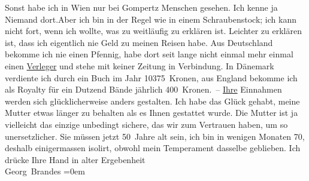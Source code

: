 \begin{ledgroupsized}[t]{13cm}
               Sonst habe ich in Wien nur bei Gompertz Menschen gesehen. Ich kenne {\pb}ja Niemand dort.\hspace*{2em}Aber ich bin in der Regel wie in einem Schraubenstock;
               ich kann nicht fort, wenn ich wollte, was zu weitläufig zu erklären ist. Leichter zu
               erklären ist, dass ich eigentlich nie Geld zu meinen Reisen habe. Aus Deutschland bekomme ich nie einen Pfennig, habe
               dort seit lange nicht einmal mehr einmal einen \uline{Verleger} und stehe mit keiner Zeitung in Verbindung. In Dänemark verdiente ich durch ein Buch im Jahr 10375 Kronen, aus
                  England bekomme ich als Royalty für ein
               Dutzend Bände jährlich 400 Kronen. – \uline{Ihre} Einnahmen
               werden sich glücklicherweise anders gestalten.\pend
           \pstart
           Ich habe das Glück gehabt, meine Mutter etwas länger zu behalten als es Ihnen gestattet wurde. Die Mutter ist
               ja vielleicht das einzige unbedingt sichere, das wir zum Vertrauen haben, um so
               unersetzlicher. Sie müssen jetzt 50 Jahre alt sein, ich bin in wenigen Monaten 70,
               deshalb einigermassen isolirt, obwohl mein Temperament dasselbe geblieben.\pend
           \pstart
           Ich drücke Ihre Hand in alter Ergebenheit{\\[\baselineskip]}\spacefill\mbox{Georg Brandes}\pend
           \leftskip=0em{}
         
         \endnumbering{}\end{ledgroupsized}  \newcommand{\dateiname}{L02040}\newcommand{\titel}{Georg Brandes an Arthur Schnitzler, 19. 10. 1911}\newcommand{\editorInnen}{Martin Anton Müller und Gerd-Hermann Susen}
      